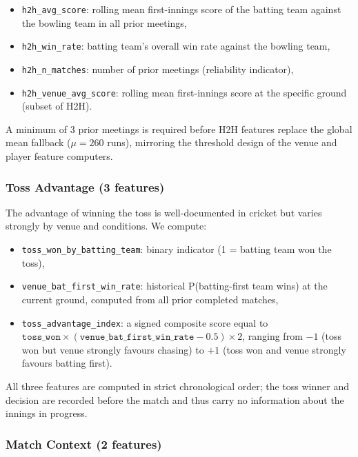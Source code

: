 \documentclass[12pt,a4paper,oneside]{report}
\begin{document}
\begin{itemize}[nosep]
    \item \texttt{h2h\_avg\_score}: rolling mean first-innings score of the batting team against the bowling team in all prior meetings,
    \item \texttt{h2h\_win\_rate}: batting team's overall win rate against the bowling team,
    \item \texttt{h2h\_n\_matches}: number of prior meetings (reliability indicator),
    \item \texttt{h2h\_venue\_avg\_score}: rolling mean first-innings score at the specific ground (subset of H2H).
\end{itemize}

A minimum of 3 prior meetings is required before H2H features replace the global mean fallback ($\mu = 260$ runs), mirroring the threshold design of the venue and player feature computers.

\subsubsection*{Toss Advantage (3 features)}

The advantage of winning the toss is well-documented in cricket but varies strongly by venue and conditions.  We compute:

\begin{itemize}[nosep]
    \item \texttt{toss\_won\_by\_batting\_team}: binary indicator (1 = batting team won the toss),
    \item \texttt{venue\_bat\_first\_win\_rate}: historical P(batting-first team wins) at the current ground, computed from all prior completed matches,
    \item \texttt{toss\_advantage\_index}: a signed composite score equal to $\texttt{toss\_won} \times (\texttt{venue\_bat\_first\_win\_rate} - 0.5) \times 2$, ranging from $-1$ (toss won but venue strongly favours chasing) to $+1$ (toss won and venue strongly favours batting first).
\end{itemize}

All three features are computed in strict chronological order; the toss winner and decision are recorded before the match and thus carry no information about the innings in progress.

\subsubsection*{Match Context (2 features)}
\end{document}
